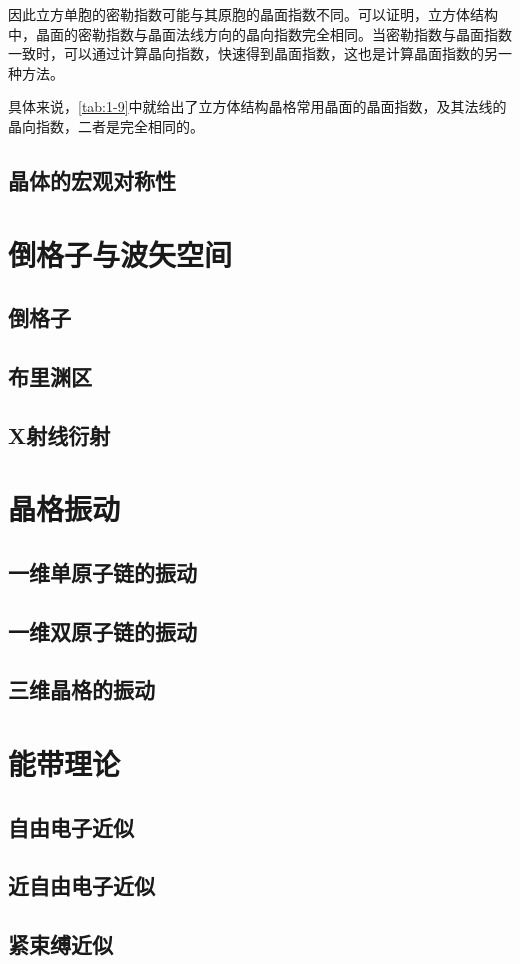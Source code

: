     因此立方单胞的密勒指数可能与其原胞的晶面指数不同。可以证明，立方体结构中，晶面的密勒指数与晶面法线方向的晶向指数完全相同。当密勒指数与晶面指数一致时，可以通过计算晶向指数，快速得到晶面指数，这也是计算晶面指数的另一种方法。
    
    具体来说，\autoref{tab:1-9}中就给出了立方体结构晶格常用晶面的晶面指数，及其法线的晶向指数，二者是完全相同的。


\section{晶体的宏观对称性}

\chapter{倒格子与波矢空间}\label{chap:2}
\section{倒格子}
\section{布里渊区}
\section{X射线衍射}

\chapter{晶格振动}
\section{一维单原子链的振动}
\section{一维双原子链的振动}
\section{三维晶格的振动}

\chapter{能带理论}
\section{自由电子近似}
\section{近自由电子近似}
\section{紧束缚近似}